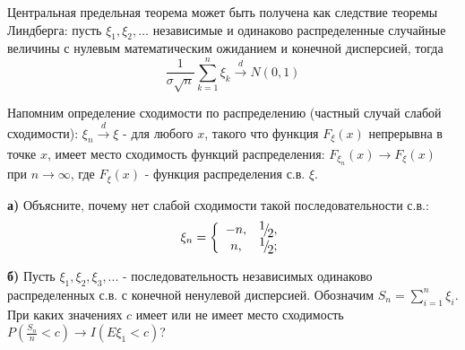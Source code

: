 \begin{remark}
Центральная предельная теорема может быть получена как следствие теоремы Линдберга: пусть $\xi_{1},  \xi_{2}, \ldots$  независимые и одинаково распределенные случайные величины с нулевым математическим ожиданием и конечной дисперсией, тогда 
\[
\frac{1}{\sigma \sqrt{n}} \underset{k=1}{\overset{n}{\sum}} \xi_{k} \overset{d}{\longrightarrow}  N(0, 1)
 \]
\end{remark}


\begin{problem}
Напомним определение сходимости по распределению (частный случай слабой сходимости): $\xi _{n} \mathop{\to }\limits_{}^{d} \xi $ - для любого $x$, такого что функция $F_{\xi } (x)$ непрерывна в точке $x$, имеет место сходимость функций распределения: $F_{\xi _{n} } (x)\to F_{\xi } (x)$ при $n\to \infty $, где $F_{\xi } (x)$ - функция распределения с.в. $\xi $.

\noindent \textbf{а)} Объясните, почему нет слабой сходимости такой последовательности с.в.:
\[\xi _{n} =\left\{\begin{array}{cc} {-n,} & {{\raise0.7ex\hbox{$ 1 $}\!\mathord{\left/ {\vphantom {1 2}} \right. \kern-\nulldelimiterspace}\!\lower0.7ex\hbox{$ 2 $}} ,} \\ {n,} & {{\raise0.7ex\hbox{$ 1 $}\!\mathord{\left/ {\vphantom {1 2}} \right. \kern-\nulldelimiterspace}\!\lower0.7ex\hbox{$ 2 $}} ;} \end{array}\right. \] 


\begin{comment}
\begin{ordre} 

\noindent $F_{\xi _{n} } (x)=\left\{\begin{array}{cc} {0,} & {x\le -n} \\ {{\raise0.7ex\hbox{$ 1 $}\!\mathord{\left/ {\vphantom {1 2}} \right. \kern-\nulldelimiterspace}\!\lower0.7ex\hbox{$ 2 $}} ,} & {-n<x\le n} \\ {1,} & {x>n} \end{array}\right. $ сходятся к функции $G(x)\equiv \frac{1}{2} $.

\end{ordre} 
\end{comment}

\noindent \textbf{б)} Пусть $\xi _{1} ,\xi _{2} ,\xi _{3} ,...$ - последовательность независимых одинаково распределенных с.в. с конечной ненулевой дисперсией. Обозначим $S_{n} =\sum _{i=1}^{n}\xi _{i}  $. При каких значениях $c$ имеет или не имеет место сходимость $P\left(\frac{S_{n} }{n} <c\right)\to I\left(E\xi _{1} <c\right)$?


\end{problem}



